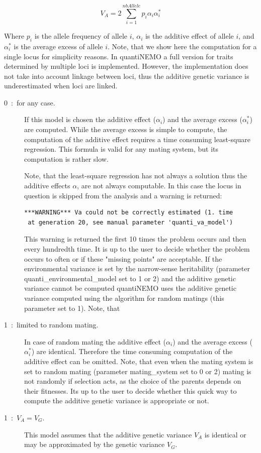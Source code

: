 \documentclass[letterpaper,12pt,oneside]{book}
\begin{document}
\begin{description}
\[ V_{A} = 2\sum_{i=1}^{nbAllele}p_{i}\alpha_{i}\alpha_{i}^{*} \]

Where $p_{i}$ is the allele frequency of allele $i$, $\alpha_{i}$ is the additive effect of allele $i$, and $\alpha_{i}^{*}$ is the average excess of allele $i$. Note, that we show here the computation for a single locus for simplicity reasons. In quantiNEMO a full version for traits determined by multiple loci is implemented. However, the implementation does not take into account linkage between loci, thus the additive genetic variance is underestimated when loci are linked.

\begin{description}
\item [0~:~for any case.] If this model is chosen the additive effect ($\alpha_{i}$) and the average excess ($\alpha_{i}^{*}$) are computed. While the average excess is simple to compute, the computation of the additive effect requires a time consuming least-square regression. This formula is valid for any mating system, but its computation is rather slow. 

Note, that the least-square regression has not always a solution thus the additive effects $\alpha$, are not always computable. In this case the locus in question is skipped from the analysis and a warning is returned:
\begin{lstlisting}[frame=single]
***WARNING*** Va could not be correctly estimated (1. time
 at generation 20, see manual parameter 'quanti_va_model')
\end{lstlisting}

This warning is returned the first 10 times the problem occurs and then every hundredth time. It is up to the user to decide whether the problem occurs to often or if these "missing points" are acceptable. If the environmental variance is set by the narrow-sense heritability (parameter \textsf{quanti\_environmental\_model} set to 1 or 2) and the additive genetic variance cannot be computed quantiNEMO uses the additive genetic variance computed using the algorithm for random matings (this parameter set to 1). Note, that  

 
\item [1~:~limited to random mating.] In case of random mating the additive effect ($\alpha_{i}$) and the average excess ($\alpha_{i}^{*}$) are identical. Therefore the time consuming computation of the additive effect can be omitted. Note, that even when the mating system is set to random mating (parameter \textsf{mating\_system} set to 0 or 2) mating is not randomly if selection acts, as the choice of the parents depends on their fitnesses. Its up to the user to decide whether this quick way to compute the additive genetic variance is appropriate or not.  

\item [1~:~$V_{A} = V_{G}$.] This model assumes that the additive genetic variance $V_{A}$ is identical or may be approximated by the genetic variance $V_{G}$. 
\end{description}
\end{description}
\end{document}
